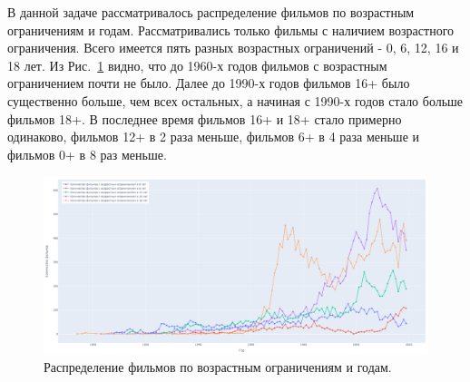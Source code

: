 В данной задаче рассматривалось распределение фильмов по возрастным ограничениям и годам. Рассматривались только фильмы с наличием возрастного ограничения. Всего имеется пять разных возрастных ограничений - 0, 6, 12, 16 и 18 лет. Из Рис.~\ref{fig:films_number_by_age_limit_calculation} видно, что до 1960-х годов фильмов с возрастным ограничением почти не было. Далее до 1990-х годов фильмов 16+ было существенно больше, чем всех остальных, а начиная с 1990-х годов стало больше фильмов 18+. В последнее время фильмов 16+ и 18+ стало примерно одинаково, фильмов 12+ в 2 раза меньше, фильмов 6+ в 4 раза меньше и фильмов 0+ в 8 раз меньше.

\begin{figure}[ht!]
	\includegraphics[width=\linewidth]{../report/images/years_restrict/1}
	\caption{Распределение фильмов по возрастным ограничениям и годам.}
	\label{fig:films_number_by_age_limit_calculation}
\end{figure}




